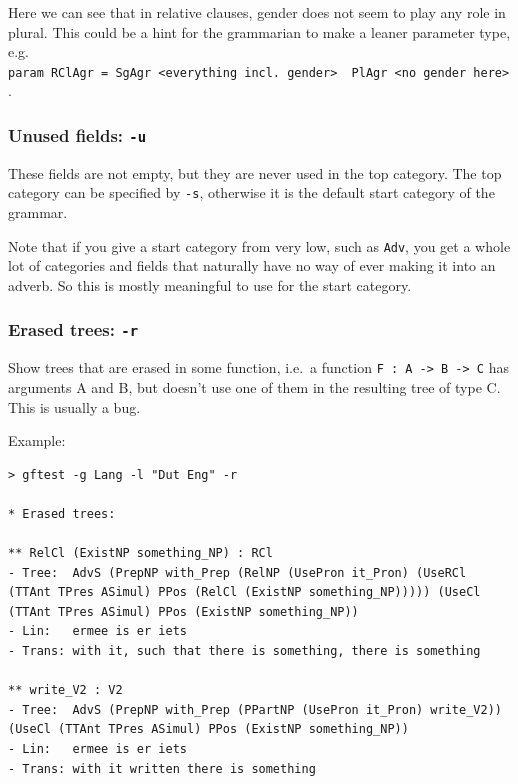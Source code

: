 Here we can see that in relative clauses, gender does not seem to play
any role in plural. This could be a hint for the grammarian to make a
leaner parameter type, e.g.
\texttt{param\ RClAgr\ =\ SgAgr\ \textless{}everything\ incl.\ gender\textgreater{}\ \textbar{}\ PlAgr\ \textless{}no\ gender\ here\textgreater{}}.

\hypertarget{unused-fields--u}{%
\subsubsection{\texorpdfstring{Unused fields:
\texttt{-u}}{Unused fields: -u}}\label{unused-fields--u}}

These fields are not empty, but they are never used in the top category.
The top category can be specified by \texttt{-s}, otherwise it is the
default start category of the grammar.

Note that if you give a start category from very low, such as
\texttt{Adv}, you get a whole lot of categories and fields that
naturally have no way of ever making it into an adverb. So this is
mostly meaningful to use for the start category.

\hypertarget{erased-trees--r}{%
\subsubsection{\texorpdfstring{Erased trees:
\texttt{-r}}{Erased trees: -r}}\label{erased-trees--r}}

Show trees that are erased in some function, i.e.~a function
\texttt{F\ :\ A\ -\textgreater{}\ B\ -\textgreater{}\ C} has arguments A
and B, but doesn't use one of them in the resulting tree of type C. This
is usually a bug.

Example:

\begin{verbatim}
> gftest -g Lang -l "Dut Eng" -r

* Erased trees:

** RelCl (ExistNP something_NP) : RCl
- Tree:  AdvS (PrepNP with_Prep (RelNP (UsePron it_Pron) (UseRCl (TTAnt TPres ASimul) PPos (RelCl (ExistNP something_NP))))) (UseCl (TTAnt TPres ASimul) PPos (ExistNP something_NP))
- Lin:   ermee is er iets
- Trans: with it, such that there is something, there is something

** write_V2 : V2
- Tree:  AdvS (PrepNP with_Prep (PPartNP (UsePron it_Pron) write_V2)) (UseCl (TTAnt TPres ASimul) PPos (ExistNP something_NP))
- Lin:   ermee is er iets
- Trans: with it written there is something
\end{verbatim}

